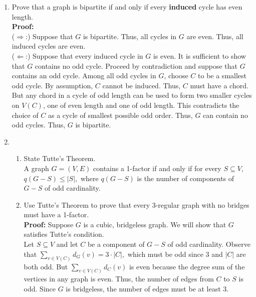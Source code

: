 \documentclass[12pt]{article}
\renewcommand{\emph}[1]{\textsf{\textbf{#1}}}
\begin{document}
\begin{enumerate}
\item Prove that a graph is bipartite if and only if every \emph{induced} cycle has even length.\\

\textbf{Proof:}\\

($\Longrightarrow$:) Suppose that $G$ is bipartite. Thus, all cycles in $G$ are even. Thus, all induced cycles are even.\\

($\Longleftarrow$:) Suppose that every induced cycle in $G$ is even. It is sufficient to show that $G$ contains no odd cycle. Proceed by contradiction and suppose that $G$ contains an odd cycle. Among all odd cycles in $G$, choose $C$ to be a smallest odd cycle. By assumption, $C$ cannot be induced. Thus, $C$ must have a chord. But any chord in a cycle of odd length can be used to form two smaller cycles on $V(C)$, one of even length and one of odd length. This contradicts the choice of $C$ as a cycle of smallest possible odd order. Thus, $G$ can contain no odd cycles. Thus, $G$ is bipartite.\\

\item 
	\begin{enumerate}
	\item State Tutte's Theorem.\\
	
	A graph $G=(V,E)$ contains a 1-factor if and only if for every $S \subseteq V,$ $q(G-S) \leq |S|,$ where $q(G-S)$ is the number of components of $G-S$ of odd cardinality.\\
	
	
	\item Use Tutte's Theorem to prove that every 3-regular graph with no bridges must have a 1-factor.\\
	
\textbf{Proof:} Suppose $G$ is a cubic, bridgeless graph. We will show that $G$ satisfies Tutte's condition. \\

Let $S \subseteq V$ and let $C$ be a component of $G-S$ of odd cardinality. Observe that $\displaystyle \sum_{v \in V(C)} d_G(v)=3\cdot |C|,$ which must be odd since 3 and $|C|$ are both odd. But $\displaystyle \sum_{v \in V(C)} d_C(v)$ is even because the degree sum of the vertices in any graph is even. Thus, the number of edges from $C$ to $S$ is odd. Since $G$ is bridgeless, the number of edges must be at least 3. \\


\end{enumerate}
\end{enumerate}
\end{document}
